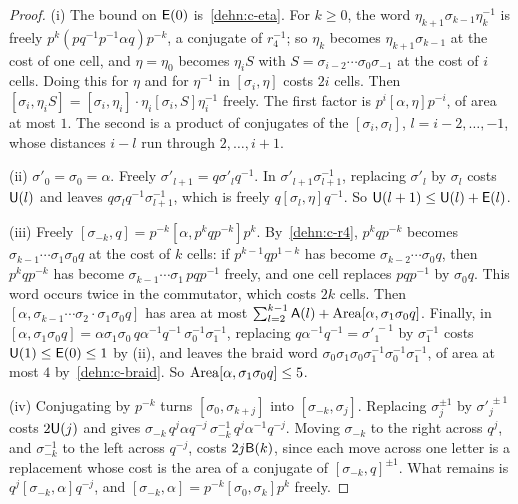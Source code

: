 \begin{proof}
(i) The bound on $\mathsf E(0)$ is~\ref{dehn:c-eta}. For $k\ge0$, the word $\eta_{k+1}\sigma_{k-1}\eta_k^{-1}$ is freely
$p^k(pq^{-1}p^{-1}\alpha q)p^{-k}$, a conjugate of $r_4^{-1}$; so $\eta_k$ becomes $\eta_{k+1}\sigma_{k-1}$ at the cost of one cell, and
$\eta=\eta_0$ becomes $\eta_iS$ with $S=\sigma_{i-2}\cdots\sigma_0\sigma_{-1}$ at the cost of $i$ cells. Doing this for $\eta$ and for
$\eta^{-1}$ in $[\sigma_i,\eta]$ costs $2i$ cells. Then $[\sigma_i,\eta_iS]=[\sigma_i,\eta_i]\cdot\eta_i[\sigma_i,S]\eta_i^{-1}$ freely. The
first factor is $p^i[\alpha,\eta]p^{-i}$, of area at most $1$. The second is a product of conjugates of the $[\sigma_i,\sigma_l]$,
$l=i-2,\dots,-1$, whose distances $i-l$ run through $2,\dots,i+1$.

(ii) $\sigma'_0=\sigma_0=\alpha$. Freely $\sigma'_{l+1}=q\sigma'_lq^{-1}$. In $\sigma'_{l+1}\sigma_{l+1}^{-1}$, replacing $\sigma'_l$ by $\sigma_l$
costs $\mathsf U(l)$ and leaves $q\sigma_lq^{-1}\sigma_{l+1}^{-1}$, which is freely $q[\sigma_l,\eta]q^{-1}$. So
$\mathsf U(l+1)\le\mathsf U(l)+\mathsf E(l)$.

(iii) Freely $[\sigma_{-k},q]=p^{-k}[\alpha,p^kqp^{-k}]p^k$. By~\ref{dehn:c-r4}, $p^kqp^{-k}$ becomes $\sigma_{k-1}\cdots\sigma_1\sigma_0q$ at the
cost of $k$ cells: if $p^{k-1}qp^{1-k}$ has become $\sigma_{k-2}\cdots\sigma_0q$, then $p^kqp^{-k}$ has become
$\sigma_{k-1}\cdots\sigma_1\,pqp^{-1}$ freely, and one cell replaces $pqp^{-1}$ by $\sigma_0q$. This word occurs twice in the commutator,
which costs $2k$ cells. Then $[\alpha,\sigma_{k-1}\cdots\sigma_2\cdot\sigma_1\sigma_0q]$ has area at most
$\sum_{l=2}^{k-1}\mathsf A(l)+\operatorname{Area}[\alpha,\sigma_1\sigma_0q]$. Finally, in $[\alpha,\sigma_1\sigma_0q]=\alpha\sigma_1\sigma_0\,q\alpha^{-1}q^{-1}\,\sigma_0^{-1}
\sigma_1^{-1}$, replacing $q\alpha^{-1}q^{-1}=\sigma'^{\,-1}_1$ by $\sigma_1^{-1}$ costs $\mathsf U(1)\le\mathsf E(0)\le1$ by (ii), and leaves the braid
word $\sigma_0\sigma_1\sigma_0\sigma_1^{-1}\sigma_0^{-1}\sigma_1^{-1}$, of area at most $4$ by~\ref{dehn:c-braid}. So
$\operatorname{Area}[\alpha,\sigma_1\sigma_0q]\le5$.

(iv) Conjugating by $p^{-k}$ turns $[\sigma_0,\sigma_{k+j}]$ into $[\sigma_{-k},\sigma_j]$. Replacing $\sigma_j^{\pm1}$ by $\sigma'^{\,\pm1}_j$ costs
$2\mathsf U(j)$ and gives $\sigma_{-k}\,q^j\alpha q^{-j}\,\sigma_{-k}^{-1}\,q^j\alpha^{-1}q^{-j}$. Moving $\sigma_{-k}$ to the right across $q^j$, and
$\sigma_{-k}^{-1}$ to the left across $q^{-j}$, costs $2j\mathsf B(k)$, since each move across one letter is a replacement whose cost is the area
of a conjugate of $[\sigma_{-k},q]^{\pm1}$. What remains is $q^j[\sigma_{-k},\alpha]q^{-j}$, and $[\sigma_{-k},\alpha]=p^{-k}[\sigma_0,\sigma_k]p^k$
freely.
\end{proof}

